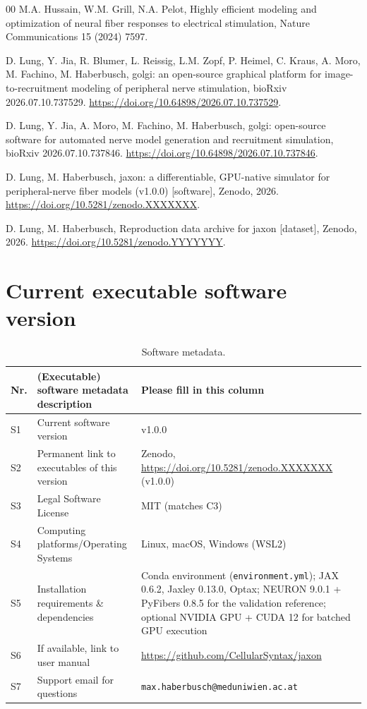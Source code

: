\documentclass[preprint,12pt,a4paper]{elsarticle}
\begin{document}
\begin{thebibliography}{00}
 M.A. Hussain, W.M. Grill, N.A. Pelot, Highly efficient modeling and
optimization of neural fiber responses to electrical stimulation, Nature Communications 15
(2024) 7597.

 D. Lung, Y. Jia, R. Blumer, L. Reissig, L.M. Zopf, P. Heimel, C. Kraus,
A. Moro, M. Fachino, M. Haberbusch, golgi: an open-source graphical platform for
image-to-recruitment modeling of peripheral nerve stimulation, bioRxiv 2026.07.10.737529.
\url{https://doi.org/10.64898/2026.07.10.737529}.

 D. Lung, Y. Jia, A. Moro, M. Fachino, M. Haberbusch, golgi: open-source
software for automated nerve model generation and recruitment simulation, bioRxiv
2026.07.10.737846. \url{https://doi.org/10.64898/2026.07.10.737846}.

 D. Lung, M. Haberbusch, jaxon: a differentiable, GPU-native simulator
for peripheral-nerve fiber models (v1.0.0) [software], Zenodo, 2026.
\url{https://doi.org/10.5281/zenodo.XXXXXXX}.

 D. Lung, M. Haberbusch, Reproduction data archive for jaxon [dataset],
Zenodo, 2026. \url{https://doi.org/10.5281/zenodo.YYYYYYY}.

\end{thebibliography}

\section*{Current executable software version}

\begin{table}[!h]
\begin{tabular}{|l|p{6.0cm}|p{6.0cm}|}
\hline
\textbf{Nr.} & \textbf{(Executable) software metadata description} & \textbf{Please fill in this column} \\
\hline
S1 & Current software version & v1.0.0 \\
\hline
S2 & Permanent link to executables of this version & Zenodo, \url{https://doi.org/10.5281/zenodo.XXXXXXX} (v1.0.0) \\
\hline
S3 & Legal Software License & MIT (matches C3) \\
\hline
S4 & Computing platforms/Operating Systems & Linux, macOS, Windows (WSL2) \\
\hline
S5 & Installation requirements \& dependencies & Conda environment (\texttt{environment.yml}); JAX 0.6.2, Jaxley 0.13.0, Optax; NEURON 9.0.1 + PyFibers 0.8.5 for the validation reference; optional NVIDIA GPU + CUDA 12 for batched GPU execution \\
\hline
S6 & If available, link to user manual & \url{https://github.com/CellularSyntax/jaxon} \\
\hline
S7 & Support email for questions & \nolinkurl{max.haberbusch@meduniwien.ac.at} \\
\hline
\end{tabular}
\caption{Software metadata.}
\label{tab:exec}
\end{table}
\end{document}

